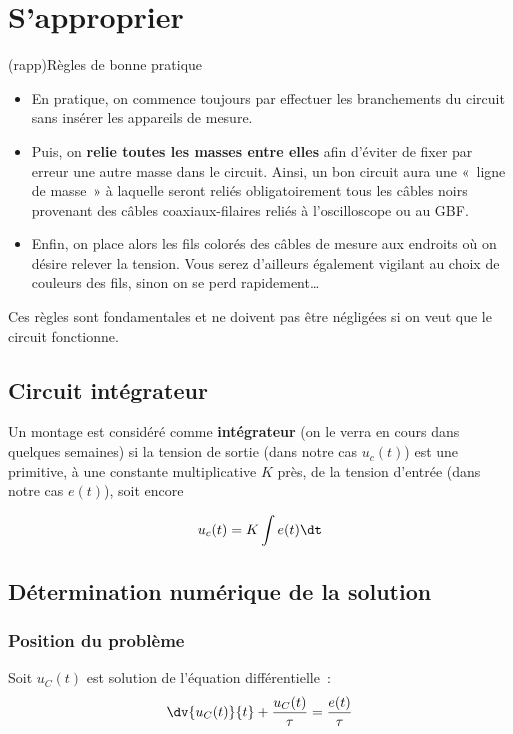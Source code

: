 \documentclass[../main/main.tex]{subfiles}
\begin{document}
\section{S'approprier}

\begin{tcb}(rapp){Règles de bonne pratique}
	\begin{itemize}
		\item En pratique, on commence toujours par effectuer les branchements du
		      circuit sans insérer les appareils de mesure.
		\item Puis, on \textbf{relie toutes les masses entre elles} afin d'éviter de
		      fixer par erreur une autre masse dans le circuit. Ainsi, un bon circuit
		      aura une «~ligne de masse~» à laquelle seront reliés obligatoirement tous
		      les câbles noirs provenant des câbles coaxiaux-filaires reliés à
		      l'oscilloscope ou au GBF.
		\item Enfin, on place alors les fils colorés des câbles de mesure aux
		      endroits où on désire relever la tension. Vous serez d'ailleurs
		      également vigilant au choix de couleurs des fils, sinon on se perd
		      rapidement…
	\end{itemize}
	Ces règles sont fondamentales et ne doivent pas être négligées si
	on veut que le circuit fonctionne.
\end{tcb}

\subsection{Circuit intégrateur}

Un montage est considéré comme \textbf{intégrateur} (on le verra en cours dans
quelques semaines) si la tension de sortie (dans notre cas $u_{c}(t)$) est une
primitive, à une constante multiplicative $K$ près, de la tension d'entrée (dans
notre cas $e(t)$), soit encore

\[u_{c}(t) = K \int e(t) \dt\]

\subsection{Détermination numérique de la solution}
\subsubsection{Position du problème}

Soit $u_{C}(t)$ est solution de l'équation différentielle~:
\[
	\dv{u_C(t)}{t} + \frac{u_C(t)}{\tau} = \frac{e(t)}{\tau}
\]
\end{document}
